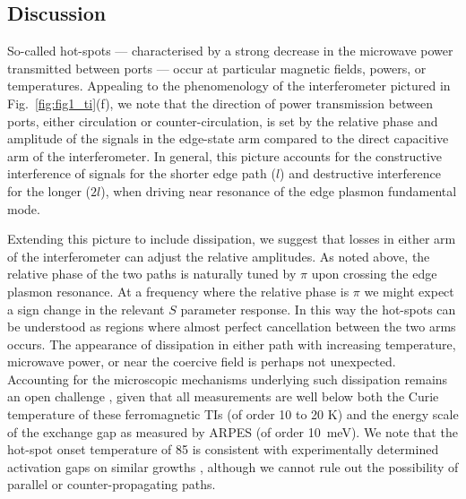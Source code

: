 \subsection{Discussion}
So-called hot-spots --- characterised by a strong decrease in the microwave power transmitted between ports --- occur at particular magnetic fields, powers, or temperatures. Appealing to the phenomenology of the interferometer pictured in Fig.~\ref{fig:fig1_ti}(f), we note that the direction of power transmission between ports, either circulation or counter-circulation, is set by the relative phase and amplitude of the signals in the edge-state arm compared to the direct capacitive arm of the interferometer. In general, this picture accounts for the constructive interference of signals for the shorter edge path ($l$) and destructive interference for the longer ($2l$), when driving near resonance of the edge plasmon fundamental mode. 

Extending this picture to include dissipation, we suggest that losses in either arm of the interferometer can adjust the relative amplitudes. As noted above, the relative phase of the two paths is naturally tuned by $\pi$ upon crossing the edge plasmon resonance. At a frequency where the relative phase is $\pi$ we might expect a sign change in the relevant $S$ parameter response. In this way the hot-spots can be understood as regions where almost perfect cancellation between the two arms occurs. The appearance of dissipation in either path with increasing temperature, microwave power, or near the coercive field is perhaps not unexpected. Accounting for the microscopic mechanisms underlying such dissipation remains an open challenge \cite{PhysRevLett.115.057206, wang2013anomalous, bestwick2015precise,wang2014universal, kou2015metal, feng2015observation, li2016origin}, given that all measurements are well below both the Curie temperature of these ferromagnetic TIs (of order 10 to 20 K) and the energy scale of the exchange gap as measured by ARPES (of order \SI{10}{\milli\electronvolt}).  We note that the hot-spot onset temperature of \SI{85}{\mk} is consistent with experimentally determined activation gaps on similar growths \cite{bestwick2015precise}, although we cannot rule out the possibility of parallel or counter-propagating paths.

